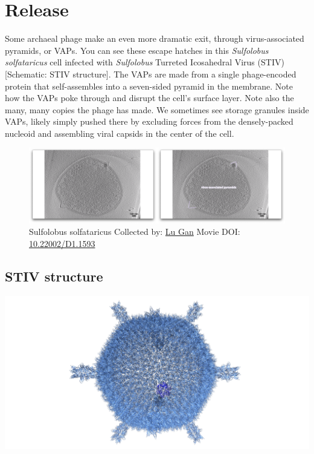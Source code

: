 \documentclass[]{tufte-book}
\begin{document}
\section{Release}\label{release}

Some archaeal phage make an even more dramatic exit, through
virus-associated pyramids, or VAPs. You can see these escape hatches in
this \emph{Sulfolobus solfataricus} cell infected with \emph{Sulfolobus}
Turreted Icosahedral Virus (STIV) {[}Schematic: STIV structure{]}. The
VAPs are made from a single phage-encoded protein that self-assembles
into a seven-sided pyramid in the membrane. Note how the VAPs poke
through and disrupt the cell's surface layer. Note also the many, many
copies the phage has made. We sometimes see storage granules inside
VAPs, likely simply pushed there by excluding forces from the
densely-packed nucleoid and assembling viral capsids in the center of
the cell.





\begin{figure}
\includegraphics{movie_stills/10_8} \caption[Sulfolobus solfataricus Collected by:
\protect\hyperlink{lu_gan}{Lu Gan} Movie DOI:
\href{https://doi.org/10.22002/D1.1593}{10.22002/D1.1593}]{Sulfolobus solfataricus Collected by:
\protect\hyperlink{lu_gan}{Lu Gan} Movie DOI:
\href{https://doi.org/10.22002/D1.1593}{10.22002/D1.1593}}\label{fig:10-8}
\end{figure}

\subsection{STIV structure}\label{STIV_structure}

\includegraphics{img/schematics/10_8_1}
\end{document}
